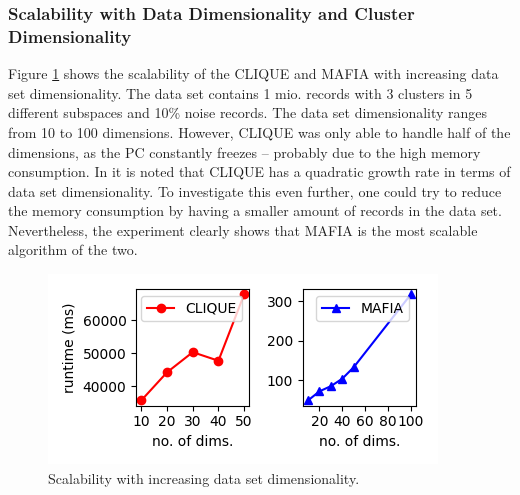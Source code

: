 \subsubsection{Scalability with Data Dimensionality and Cluster Dimensionality}
Figure \ref{fig:data_dimensionality_vs_runtime} shows the scalability of the CLIQUE and MAFIA with increasing data set dimensionality. The data set contains 1 mio. records with 3 clusters in 5 different subspaces and 10\% noise records. The data set dimensionality ranges from 10 to 100 dimensions. However, CLIQUE was only able to handle half of the dimensions, as the PC constantly freezes -- probably due to the high memory consumption. In \cite{clique} it is noted that CLIQUE has a quadratic growth rate in terms of data set dimensionality. To investigate this even further, one could try to reduce the memory consumption by having a smaller amount of records in the data set. Nevertheless, the experiment clearly shows that MAFIA is the most scalable algorithm of the two.
\begin{figure}[H]
    \vspace*{-0.5cm}
    \centering
    \includegraphics[scale=0.45]{figures/data_dimensionality_vs_runtime.png}
    \caption{Scalability with increasing data set dimensionality.}
    \label{fig:data_dimensionality_vs_runtime}
    \vspace*{-0.5cm}
\end{figure}

